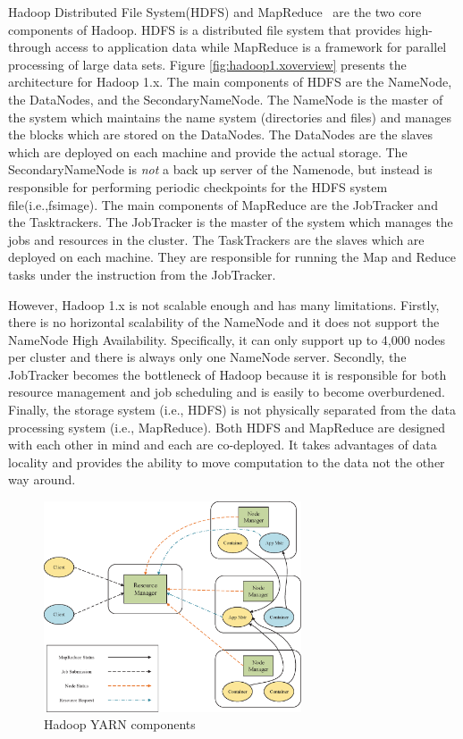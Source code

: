 Hadoop Distributed File System(HDFS) and MapReduce~\cite{dean2008mapreduce} are the two core components of Hadoop. HDFS is a distributed file system that provides high-through access to application data while MapReduce is a framework for parallel processing of large data sets. Figure \ref{fig:hadoop1.xoverview} presents the architecture for Hadoop 1.x. The main components of HDFS are the NameNode, the DataNodes, and the SecondaryNameNode. The NameNode is the master of the system which maintains the name system (directories and files) and manages the blocks which are stored on the DataNodes. The DataNodes are the slaves which are deployed on each machine and provide the actual storage. The SecondaryNameNode is {\em not} a back up server of the Namenode, but instead is responsible for performing periodic checkpoints for the HDFS system file(i.e.,fsimage). The main components of MapReduce are the JobTracker and the Tasktrackers. The JobTracker is the master of the system which manages the jobs and resources in the cluster. The TaskTrackers are the slaves which are deployed on each machine. They are responsible for running the Map and Reduce tasks under the instruction from the JobTracker.


However, Hadoop 1.x is not scalable enough and has many limitations. Firstly, there is no horizontal scalability of the NameNode and it does not support the NameNode High Availability. Specifically, it can only support up to 4,000 nodes per cluster and there is always only one NameNode server. Secondly, the JobTracker becomes the bottleneck of Hadoop because it is responsible for both resource management and job scheduling and is easily to become overburdened. Finally, the storage system (i.e., HDFS) is not physically separated from the data processing system (i.e., MapReduce). Both HDFS and MapReduce are designed with each other in mind and each are co-deployed. It takes advantages of data locality and provides the ability to move computation to the data not the other way around.

\begin{figure}[t]
  \centering
  \includegraphics[width=3in]{figs/yarn.eps}
  \caption{Hadoop YARN components}
  \label{fig:yarnoverview}
\end{figure}

